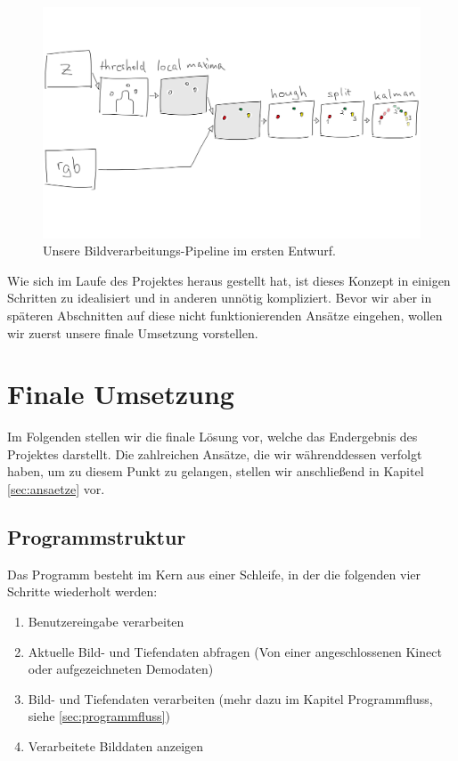 \documentclass[12pt,a4paper,ngerman]{scrartcl}
\begin{document}
\begin{figure}[H]
    \centering
    \includegraphics[scale=0.14]{img/processing-pipeline.png}
    \caption{Unsere Bildverarbeitungs-Pipeline im ersten Entwurf.}
    \label{ourpipeline}
\end{figure}

Wie sich im Laufe des Projektes heraus gestellt hat, ist dieses Konzept in einigen Schritten zu idealisiert und in anderen unnötig
kompliziert. Bevor wir aber in späteren Abschnitten auf diese nicht funktionierenden
Ansätze eingehen, wollen wir zuerst unsere finale Umsetzung vorstellen.

\section{Finale Umsetzung}
\label{sec:final}

Im Folgenden stellen wir die finale Lösung vor, welche das Endergebnis des
Projektes darstellt. Die zahlreichen Ansätze, die wir währenddessen verfolgt haben, um zu
diesem Punkt zu gelangen, stellen wir anschließend in Kapitel \ref{sec:ansaetze} vor.

\subsection{Programmstruktur}

Das Programm besteht im Kern aus einer Schleife, in der die folgenden vier Schritte  wiederholt werden:
\begin{enumerate}
  \item Benutzereingabe verarbeiten
  \item Aktuelle Bild- und Tiefendaten abfragen (Von einer angeschlossenen Kinect oder aufgezeichneten Demodaten)
  \item Bild- und Tiefendaten verarbeiten (mehr dazu im Kapitel Programmfluss, siehe \ref{sec:programmfluss})
  \item Verarbeitete Bilddaten anzeigen
\end{enumerate}
\end{document}
